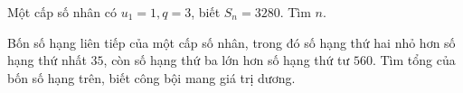 \begin{bt}%
	Một cấp số nhân có $u_1=1, q=3$, biết $S_n=3280$. Tìm $n$.	
\end{bt}


\begin{bt}%
	Bốn số hạng liên tiếp của một cấp số nhân, trong đó số hạng thứ hai nhỏ hơn số hạng thứ nhất $35$, còn số hạng thứ ba lớn hơn số hạng thứ tư $560$. Tìm tổng của bốn số hạng trên, biết công bội mang giá trị dương.
\end{bt}

